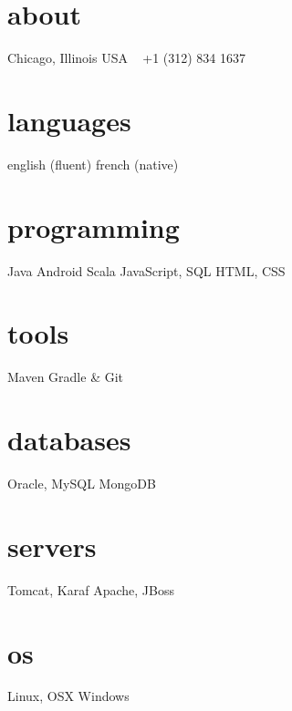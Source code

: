 \documentclass[]{friggeri-cv} %
\begin{document}



\begin{aside} %
\section{about}
{\color{darkgray}Chicago, Illinois
USA
~
+1 (312) 834 1637
~
\section{languages}
english (fluent)
french (native)
\section{programming}
Java
Android
Scala
JavaScript, SQL
HTML, CSS
\section{tools}
Maven Gradle \& Git
\section{databases}
Oracle, MySQL
MongoDB}
\section{servers}
Tomcat, Karaf 
Apache, JBoss
\section{os}
Linux, OSX
Windows
\end{aside}

\end{document}
